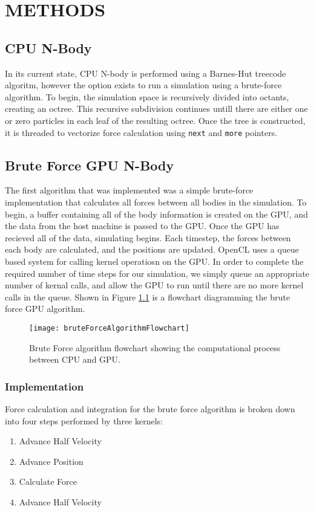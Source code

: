 \documentclass{thesis}
\begin{document}
\chapter{METHODS}
\section{CPU N-Body}
In its current state, CPU N-body is performed using a Barnes-Hut treecode algoritm, however the option exists to run a simulation using a brute-force algorithm. To begin, the simulation space is recursively divided into octants, creating an octree. This recursive subdivision continues untill there are either one or zero particles in each leaf of the resulting octree. Once the tree is constructed, it is threaded to vectorize force calculation using \texttt{next} and \texttt{more} pointers. 
\section{Brute Force GPU N-Body}
The first algorithm that was implemented was a simple brute-force implementation that calculates all forces between all bodies in the simulation. To begin, a buffer containing all of the body information is created on the GPU, and the data from the host machine is passed to the GPU. Once the GPU has recieved all of the data, simulating begins. Each timestep, the forces between each body are calculated, and the positions are updated. OpenCL uses a queue based system for calling kernel operatiosn on the GPU. In order to complete the required number of time steps for our simulation, we simply queue an appropriate number of kernal calls, and allow the GPU to run until there are no more kernel calls in the queue. Shown in Figure \ref{fig:GPUBruteForceAlg} is a flowchart diagramming the brute force GPU algorithm.

\begin{figure}[h]
    \caption{Brute Force algorithm flowchart showing the computational process between CPU and GPU.}
    \label{fig:GPUBruteForceAlg}
    \centering
    \texttt{[image: bruteForceAlgorithmFlowchart]}
\end{figure}

\subsection{Implementation}
Force calculation and integration for the brute force algorithm is broken down into four steps performed by three kernels:
\begin{enumerate}
    \item Advance Half Velocity
    \item Advance Position
    \item Calculate Force
    \item Advance Half Velocity
\end{enumerate}
\end{document}
